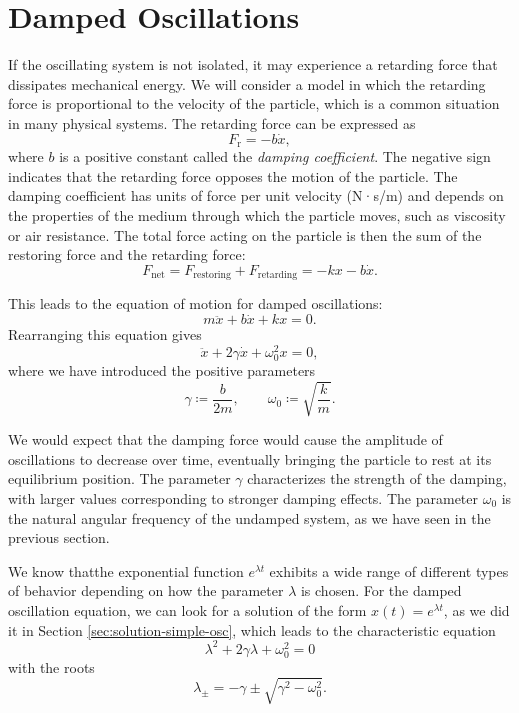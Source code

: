 \documentclass[../main.tex]{subfiles}
\begin{document}
\section{Damped Oscillations}  
If the oscillating system is not isolated, it may experience a retarding force that dissipates mechanical energy. We will consider a model in which the retarding force is proportional to the velocity of the particle, which is a common situation in many physical systems. The retarding force can be expressed as
\begin{equation}
    F_\text{r}=-b\dot{x},
\end{equation}
where $b$ is a positive constant called the \textit{damping coefficient}. The negative sign indicates that the retarding force opposes the motion of the particle. The damping coefficient has units of force per unit velocity (N·s/m) and depends on the properties of the medium through which the particle moves, such as viscosity or air resistance. The total force acting on the particle is then the sum of the restoring force and the retarding force:
\begin{equation}
    F_\text{net}=F_\text{restoring}+F_\text{retarding}=-kx-b\dot{x}.
\end{equation}

This leads to the equation of motion for damped oscillations:
\begin{equation}
    m\ddot{x}+b\dot{x}+kx=0.
\end{equation}
Rearranging this equation gives
\begin{equation}
    \ddot{x}+2\gamma\dot{x}+\omega_0^2 x=0,
    \label{eq:damped-osc-eq-of-motion}
\end{equation}
where we have introduced the positive parameters
\begin{equation}
    \gamma\coloneqq \frac{b}{2m},
    \qquad
    \omega_0\coloneqq \sqrt{\frac{k}{m}}.
\end{equation}

We would expect that the damping force would cause the amplitude of oscillations to decrease over time, eventually bringing the particle to rest at its equilibrium position. The parameter $\gamma$ characterizes the strength of the damping, with larger values corresponding to stronger damping effects. The parameter $\omega_0$ is the natural angular frequency of the undamped system, as we have seen in the previous section.

We know thatthe exponential function $e^{\lambda t}$ exhibits a wide range of different types of behavior depending on how the parameter $\lambda$ is chosen. For the damped oscillation equation, we can look for a solution of the form $x(t)=e^{\lambda t}$, as we did it in Section \ref{sec:solution-simple-osc}, which leads to the characteristic equation
\begin{equation}
    \lambda^2+2\gamma\lambda+\omega_0^2=0
\end{equation}
with the roots
\begin{equation}
    \lambda_\pm=-\gamma\pm\sqrt{\gamma^2-\omega_0^2}.
\end{equation}
\end{document}
